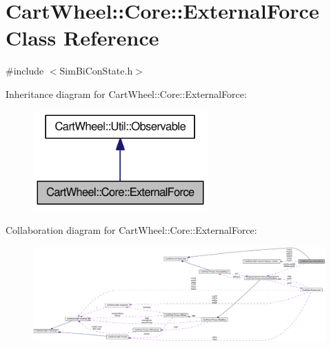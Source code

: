 \hypertarget{classCartWheel_1_1Core_1_1ExternalForce}{
\section{CartWheel::Core::ExternalForce Class Reference}
\label{classCartWheel_1_1Core_1_1ExternalForce}
}


{\ttfamily \#include $<$SimBiConState.h$>$}



Inheritance diagram for CartWheel::Core::ExternalForce:\nopagebreak
\begin{figure}[H]
\begin{center}
\leavevmode
\includegraphics[width=190pt]{classCartWheel_1_1Core_1_1ExternalForce__inherit__graph}
\end{center}
\end{figure}


Collaboration diagram for CartWheel::Core::ExternalForce:\nopagebreak
\begin{figure}[H]
\begin{center}
\leavevmode
\includegraphics[width=400pt]{classCartWheel_1_1Core_1_1ExternalForce__coll__graph}
\end{center}
\end{figure}

